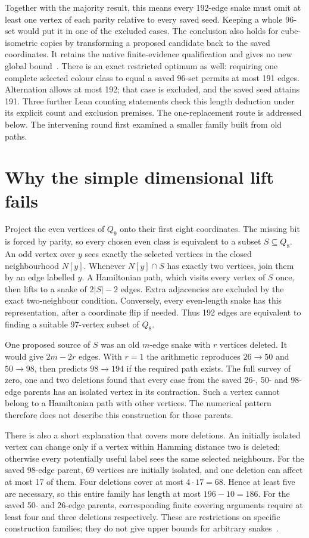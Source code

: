 \documentclass[11pt,a4paper]{article}
\begin{document}
Together with the majority result, this means every 192-edge snake must
omit at least one vertex of each parity relative to every saved seed.
Keeping a whole 96-set would put it in one of the excluded cases. The
conclusion also holds for cube-isometric copies by transforming a
proposed candidate back to the saved coordinates. It retains the native
finite-evidence qualification and gives no new global bound~\cite{research232}.
There is an exact restricted optimum as well: requiring one complete
selected colour class to equal a saved 96-set permits at most 191 edges. Alternation
allows at most 192; that case is excluded, and the saved seed attains 191.
Three further Lean counting statements check this length deduction under
its explicit count and exclusion premises.
The one-replacement route is addressed below. The intervening round
first examined a smaller family built from old paths.

\section{Why the simple dimensional lift fails}
Project the even vertices of $Q_9$ onto their first eight coordinates.
The missing bit is forced by parity, so every chosen even class is
equivalent to a subset $S\subseteq Q_8$. An odd vertex over $y$ sees
exactly the selected vertices in the closed neighbourhood $N[y]$.
Whenever $N[y]\cap S$ has exactly two vertices, join them by an edge
labelled $y$. A Hamiltonian path, which visits every vertex of $S$
once, then lifts to a snake of $2|S|-2$ edges. Extra adjacencies are
excluded by the exact two-neighbour condition. Conversely, every
even-length snake has this representation, after a coordinate flip
if needed. Thus 192 edges are equivalent to finding a suitable
97-vertex subset of $Q_8$.

One proposed source of $S$ was an old $m$-edge snake with $r$ vertices
deleted. It would give $2m-2r$ edges. With $r=1$ the arithmetic reproduces
$26\to50$ and $50\to98$, then predicts $98\to194$ if the required path
exists. The full survey of zero, one and two deletions found that every
case from the saved 26-, 50- and 98-edge parents has an isolated vertex
in its contraction. Such a vertex cannot belong to a Hamiltonian path
with other vertices. The numerical pattern therefore does not describe
this construction for those parents.

There is also a short explanation that covers more deletions. An
initially isolated vertex can change only if a vertex within Hamming
distance two is deleted; otherwise every potentially useful label sees
the same selected neighbours. For the saved 98-edge parent, 69 vertices
are initially isolated, and one deletion can affect at most 17 of them.
Four deletions cover at most $4\cdot17=68$. Hence at least five are
necessary, so this entire family has length at most $196-10=186$.
For the saved 50- and 26-edge parents, corresponding finite covering
arguments require at least four and three deletions respectively.
These are restrictions on specific construction families; they do not
give upper bounds for arbitrary snakes~\cite{research233}.
\end{document}
